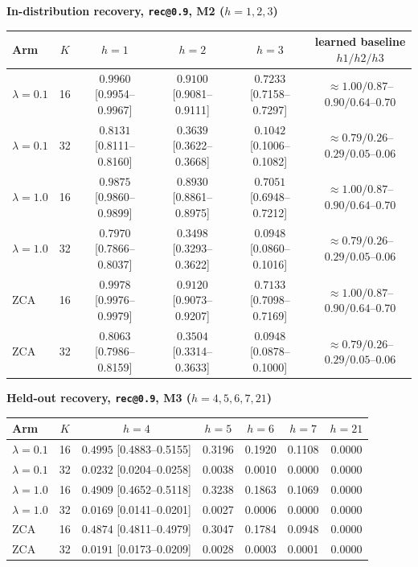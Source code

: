 \begin{table}[htbp]
\vspace{10pt}
\textbf{In-distribution recovery, \texttt{rec@0.9}, M2 ($h{=}1,2,3$)}\\[2pt]
\begin{tabular}{lccccc}
\toprule
Arm & $K$ & $h{=}1$ & $h{=}2$ & $h{=}3$ & learned baseline $h1/h2/h3$ \\
\midrule
$\lambda{=}0.1$ & 16 & $0.9960$ [0.9954--0.9967] & $0.9100$ [0.9081--0.9111] & $0.7233$ [0.7158--0.7297] & $\approx 1.00 / 0.87$--$0.90 / 0.64$--$0.70$ \\
$\lambda{=}0.1$ & 32 & $0.8131$ [0.8111--0.8160] & $0.3639$ [0.3622--0.3668] & $0.1042$ [0.1006--0.1082] & $\approx 0.79 / 0.26$--$0.29 / 0.05$--$0.06$ \\
$\lambda{=}1.0$ & 16 & $0.9875$ [0.9860--0.9899] & $0.8930$ [0.8861--0.8975] & $0.7051$ [0.6948--0.7212] & $\approx 1.00 / 0.87$--$0.90 / 0.64$--$0.70$ \\
$\lambda{=}1.0$ & 32 & $0.7970$ [0.7866--0.8037] & $0.3498$ [0.3293--0.3622] & $0.0948$ [0.0860--0.1016] & $\approx 0.79 / 0.26$--$0.29 / 0.05$--$0.06$ \\
ZCA & 16 & $0.9978$ [0.9976--0.9979] & $0.9120$ [0.9073--0.9207] & $0.7133$ [0.7098--0.7169] & $\approx 1.00 / 0.87$--$0.90 / 0.64$--$0.70$ \\
ZCA & 32 & $0.8063$ [0.7986--0.8159] & $0.3504$ [0.3314--0.3633] & $0.0948$ [0.0878--0.1000] & $\approx 0.79 / 0.26$--$0.29 / 0.05$--$0.06$ \\
\bottomrule
\end{tabular}

\vspace{10pt}
\textbf{Held-out recovery, \texttt{rec@0.9}, M3 ($h{=}4,5,6,7,21$)}\\[2pt]
\begin{tabular}{lcccccc}
\toprule
Arm & $K$ & $h{=}4$ & $h{=}5$ & $h{=}6$ & $h{=}7$ & $h{=}21$ \\
\midrule
$\lambda{=}0.1$ & 16 & $0.4995$ [0.4883--0.5155] & 0.3196 & 0.1920 & 0.1108 & 0.0000 \\
$\lambda{=}0.1$ & 32 & $0.0232$ [0.0204--0.0258] & 0.0038 & 0.0010 & 0.0000 & 0.0000 \\
$\lambda{=}1.0$ & 16 & $0.4909$ [0.4652--0.5118] & 0.3238 & 0.1863 & 0.1069 & 0.0000 \\
$\lambda{=}1.0$ & 32 & $0.0169$ [0.0141--0.0201] & 0.0027 & 0.0006 & 0.0000 & 0.0000 \\
ZCA & 16 & $0.4874$ [0.4811--0.4979] & 0.3047 & 0.1784 & 0.0948 & 0.0000 \\
ZCA & 32 & $0.0191$ [0.0173--0.0209] & 0.0028 & 0.0003 & 0.0001 & 0.0000 \\
\bottomrule
\end{tabular}


\end{table}
